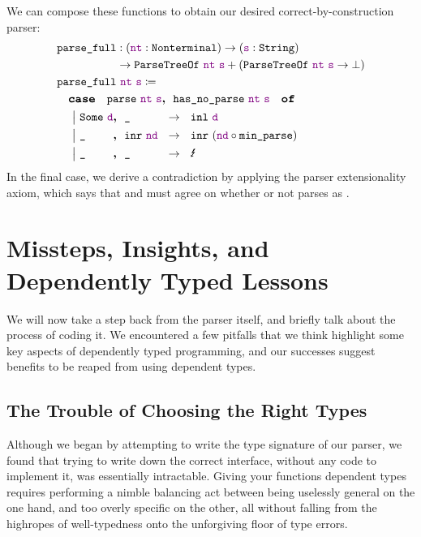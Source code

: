     We can compose these functions to obtain our desired correct-by-construction parser:
    \begin{align*}
      & \fname{parse\_full} \oftypesep (\oftype{\farg{nt}}{\Nonterminal}) \typeto (\oftype{\farg{s}}{\String}) \\
      & \phantom{\fname{parse\_full} }\typeto \typesum{\indname{ParseTreeOf}~\farg{nt}~\farg{s}}{\left(\indname{ParseTreeOf}~\farg{nt}~\farg{s}\typeto\False\right)} \\
      & \fname{parse\_full}~\farg{nt}~\farg{s} \defeq \\
      & \quad \caseof{\fname{parse}~\farg{nt}~\farg{s}\textbf{,}~~\fname{has\_no\_parse}~\farg{nt}~\farg{s}} \\
      & \quad \acase{\Some{\farg{d}}\textbf{,}~~\aswidthof{\termhole}{\inr{\farg{nd}}}}{\inl{\farg{d}}} \\
      & \quad \acase{\aswidthof{\termhole}{\Some{\farg{d}}}\textbf{,}~~\inr{\farg{nd}}}{\inrp{\farg{nd}\circ\fname{min\_parse}}} \\
      & \quad \acase{\aswidthof{\termhole}{\Some{\farg{d}}}\textbf{,}~~\aswidthof{\termhole}{\inr{\farg{nd}}}}{\text{\Lightning{}}}
    \end{align*}
    In the final case, we derive a contradiction by applying the parser extensionality axiom, which says that  and  must agree on whether or not  parses as .
    
\section{Missteps, Insights, and Dependently Typed Lessons} \label{sec:lessons}
  We will now take a step back from the parser itself, and briefly talk about the process of coding it.  We encountered a few pitfalls that we think highlight some key aspects of dependently typed programming, and our successes suggest benefits to be reaped from using dependent types.

  \subsection{The Trouble of Choosing the Right Types}
    Although we began by attempting to write the type signature of our parser, we found that trying to write down the correct interface, without any code to implement it, was essentially intractable.  Giving your functions dependent types requires performing a nimble balancing act between being uselessly general on the one hand, and too overly specific on the other, all without falling from the highropes of well-typedness onto the unforgiving floor of type errors.

